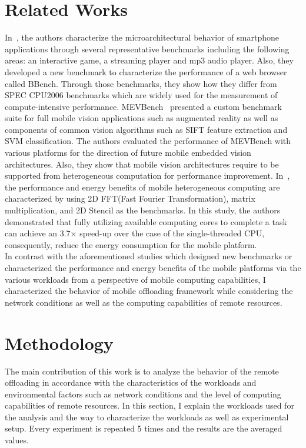 \section{Related Works}
\label{character:relatedworks}
In~\cite{fullsystem}, the authors characterize the microarchitectural
behavior of smartphone applications through several representative
benchmarks including the following areas: an interactive game, a
streaming player and mp3 audio player.
%
Also, they developed a new benchmark to characterize the performance 
of a web browser called BBench.
%
Through those benchmarks, they show how they differ from SPEC CPU2006
benchmarks which are widely used for the measurement of compute-intensive
performance.
%
MEVBench~\cite{mevbench} presented a custom benchmark suite for full mobile
vision applications such as augmented reality as well as components of
common vision algorithms such as SIFT feature extraction and SVM
classification.
%
The authors evaluated the performance of MEVBench with various
platforms for the direction of future mobile embedded vision
architectures.
%
Also, they show that mobile vision architectures require to be supported
from heterogeneous computation for performance improvement.
%
In~\cite{characterization}, the performance and energy benefits of
mobile heterogeneous computing are characterized by using 2D FFT(Fast
Fourier Transformation), matrix multiplication, and 2D Stencil as the
benchmarks.
%
In this study, the authors demonstrated that fully utilizing available
computing cores to complete a task can achieve an 3.7$\times$ speed-up
over the case of the single-threaded CPU, consequently, reduce the
energy consumption for the mobile platform.\\
%
In contrast with the aforementioned studies which designed new
benchmarks or characterized the performance and energy benefits of
the mobile platforms via the various workloads from a perspective of
mobile computing capabilities, I characterized the behavior of mobile
offloading framework while considering the network conditions as well as
the computing capabilities of remote resources.
%
\section{Methodology}
\label{character:methodology}
%
The main contribution of this work is to analyze the behavior of the
remote offloading in accordance with the characteristics of the
workloads and environmental factors such as network conditions and the
level of computing capabilities of remote resources.
%
In this section, I explain the workloads used for the analysis and the
way to characterize the workloads as well as experimental setup.
%
Every experiment is repeated 5 times and the results are the averaged 
values.
%

